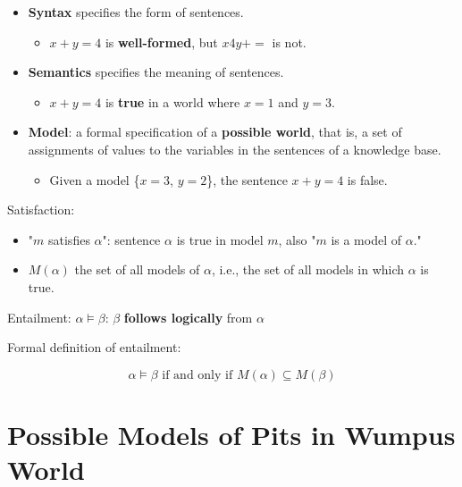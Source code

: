\documentclass[11pt]{article}
\begin{document}
\begin{itemize}
\item \textbf{Syntax} specifies the form of sentences.

\begin{itemize}
\item \(x + y = 4\) is \textbf{well-formed}, but \(x4y+=\) is not.
\end{itemize}

\item \textbf{Semantics} specifies the meaning of sentences.

\begin{itemize}
\item \(x + y = 4\) is \textbf{true} in a world where \(x = 1\) and \(y = 3\).
\end{itemize}

\item \textbf{Model}: a formal specification of a \textbf{possible world}, that is, a set of assignments of values to the variables in the sentences of a knowledge base.

\begin{itemize}
\item Given a model \{\(x = 3\), \(y = 2\)\}, the sentence \(x + y = 4\) is false.
\end{itemize}
\end{itemize}

Satisfaction:

\begin{itemize}
\item "\(m\) satisfies \(\alpha\)": sentence \(\alpha\) is true in model \(m\), also "\(m\) is a model of \(\alpha\)."
\item \(M(\alpha)\) the set of all models of \(\alpha\), i.e., the set of all models in which \(\alpha\) is true.
\end{itemize}

Entailment: \(\alpha \models \beta\): \(\beta\) \textbf{follows logically} from \(\alpha\)

Formal definition of entailment:

\begin{equation*}
\alpha \models \beta \text{ if and only if } M(\alpha) \subseteq M(\beta)
\end{equation*}
\section{Possible Models of Pits in Wumpus World}
\label{sec:org68f3d41}
\end{document}
